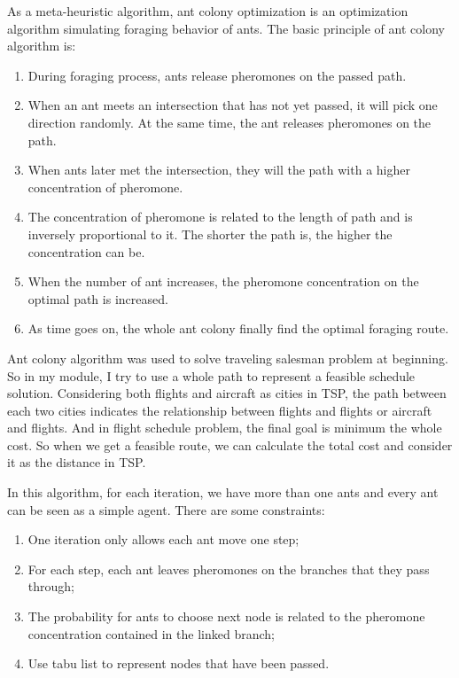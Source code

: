 \documentclass[senior]{IPSstyle}
\begin{document}
As a meta-heuristic algorithm, ant colony optimization is an optimization algorithm simulating foraging behavior of ants. The basic principle of ant colony algorithm is:
\begin{enumerate}
    \item During foraging process, ants release pheromones on the passed path.
    \item When an ant meets an intersection that has not yet passed, it will pick one direction randomly. At the same time, the ant releases pheromones on the path.
    \item When ants later met the intersection, they will the path with a higher concentration of pheromone.
    \item The concentration of pheromone is related to the length of path and is inversely proportional to it. The shorter the path is, the higher the concentration can be.
    \item When the number of ant increases, the pheromone concentration on the optimal path is increased.
    \item As time goes on, the whole ant colony finally find the optimal foraging route.
\end{enumerate}

Ant colony algorithm  was used to solve traveling salesman problem at beginning. 
So in my module, I try to use a whole path to represent a feasible schedule solution. 
Considering both flights and aircraft as cities in TSP,  the path between each two cities indicates the relationship between flights and flights or aircraft and flights. 
And in flight schedule problem, the final goal is minimum the whole cost. So when we get a feasible route, we can calculate the total cost and consider it as the distance in TSP.

In this algorithm, for each iteration, we have more than one ants and every ant can be seen as a simple agent. There are some constraints:
\begin{enumerate}
    \item One iteration only allows each ant move one step;
    \item For each step, each ant leaves pheromones on the branches that they pass through;
    \item The probability for ants to choose next node is related to the pheromone concentration contained in the linked branch;
    \item Use tabu list to represent nodes that have been passed.
\end{enumerate}
\end{document}
